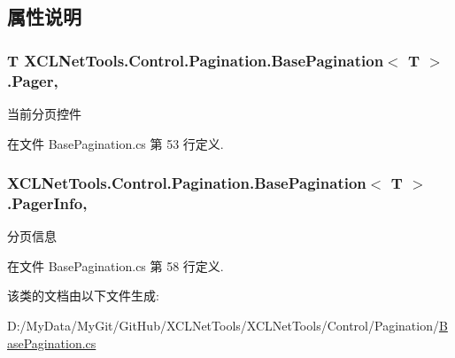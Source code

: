 \subsection{属性说明}
\hypertarget{class_x_c_l_net_tools_1_1_control_1_1_pagination_1_1_base_pagination_3_01_t_01_4_ae0cfdba3ea23387da4b851c4d695d0a0}{
\subsubsection[{Pager}]{\setlength{\rightskip}{0pt plus 5cm}T X\-C\-L\-Net\-Tools.\-Control.\-Pagination.\-Base\-Pagination$<$ T $>$.Pager\hspace{0.3cm}{\ttfamily [get]}, {\ttfamily [set]}}}\label{class_x_c_l_net_tools_1_1_control_1_1_pagination_1_1_base_pagination_3_01_t_01_4_ae0cfdba3ea23387da4b851c4d695d0a0}


当前分页控件 



在文件 Base\-Pagination.\-cs 第 53 行定义.

\hypertarget{class_x_c_l_net_tools_1_1_control_1_1_pagination_1_1_base_pagination_3_01_t_01_4_ae27d645cd692bb7471bc6236c59496a3}{
\subsubsection[{Pager\-Info}]{ X\-C\-L\-Net\-Tools.\-Control.\-Pagination.\-Base\-Pagination$<$ T $>$.Pager\-Info\hspace{0.3cm}{\ttfamily [get]}, {\ttfamily [set]}}}\label{class_x_c_l_net_tools_1_1_control_1_1_pagination_1_1_base_pagination_3_01_t_01_4_ae27d645cd692bb7471bc6236c59496a3}


分页信息 



在文件 Base\-Pagination.\-cs 第 58 行定义.



该类的文档由以下文件生成\-:\begin{DoxyCompactItemize}
\item 
D\-:/\-My\-Data/\-My\-Git/\-Git\-Hub/\-X\-C\-L\-Net\-Tools/\-X\-C\-L\-Net\-Tools/\-Control/\-Pagination/\hyperlink{_base_pagination_8cs}{Base\-Pagination.\-cs}\end{DoxyCompactItemize}
